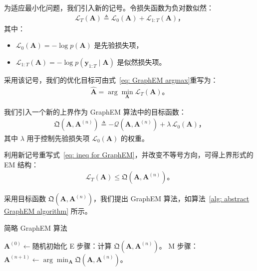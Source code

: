 为适应最小化问题，我们引入新的记号。令损失函数为负对数似然：
\begin{align}
    \mathcal{L}_T(\mathbf{A}) \triangleq \mathcal{L}_0(\mathbf{A}) + \mathcal{L}_{1:T}(\mathbf{A})，
\end{align}
其中：
\begin{itemize}
    \item \(\mathcal{L}_0(\mathbf{A}) = -\log p(\mathbf{A})\) 是先验损失项，
    \item \(\mathcal{L}_{1:T}(\mathbf{A}) = -\log p(\mathbf{y}_{1:T} \mid \mathbf{A})\) 是似然损失项。
\end{itemize}

采用该记号，我们的优化目标可由式~\eqref{eq: GraphEM argmax}重写为：
\begin{align}
    \widehat{\mathbf{A}} = \arg \min_{\mathbf{A}} \mathcal{L}_T(\mathbf{A})。
\end{align}

我们引入一个新的上界作为 GraphEM 算法中的目标函数：
\begin{align}
    \mathfrak{Q}(\mathbf{A}, \mathbf{A}^{(n)}) \triangleq -\mathcal{Q}(\mathbf{A}, \mathbf{A}^{(n)}) + \lambda \, \mathcal{L}_0(\mathbf{A})， \label{eq: new upper bound for GraphEM}
\end{align}
其中 \(\lambda\) 用于控制先验损失项 \(\mathcal{L}_0(\mathbf{A})\) 的权重。

利用新记号重写式~\eqref{eq: ineq for GraphEM}，并改变不等号方向，可得上界形式的 EM 结构：
\begin{align}
    \mathcal{L}_T(\mathbf{A}) \le \mathfrak{Q}(\mathbf{A}, \mathbf{A}^{(n)})。
\end{align}

采用目标函数 \(\mathfrak{Q}(\mathbf{A}, \mathbf{A}^{(n)})\)，我们提出 GraphEM 算法，如算法~\ref{alg: abstract GraphEM algorithm} 所示。

\begin{algorithm}[tb]
    \caption{简略 GraphEM 算法}
    \label{alg: abstract GraphEM algorithm}
    \begin{algorithmic}[1]
        \STATE \(\mathbf{A}^{(0)} \gets \text{随机初始化}\)
            \STATE E 步骤：计算 \(\mathfrak{Q}(\mathbf{A}, \mathbf{A}^{(n)})\)。
            \STATE M 步骤：\(\mathbf{A}^{(n+1)} \gets \arg \min_{\mathbf{A}} \mathfrak{Q}(\mathbf{A}, \mathbf{A}^{(n)})\)。
        \ENDFOR
    \end{algorithmic}
\end{algorithm}

